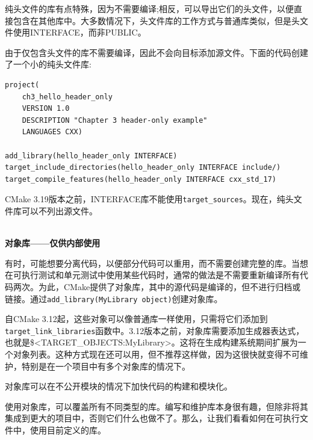 纯头文件的库有点特殊，因为不需要编译;相反，可以导出它们的头文件，以便直接包含在其他库中。大多数情况下，头文件库的工作方式与普通库类似，但是头文件使用INTERFACE，而非PUBLIC。

由于仅包含头文件的库不需要编译，因此不会向目标添加源文件。下面的代码创建了一个小的纯头文件库:

\begin{lstlisting}[style=styleCMake]
project(
	ch3_hello_header_only
	VERSION 1.0
	DESCRIPTION "Chapter 3 header-only example"
	LANGUAGES CXX)

add_library(hello_header_only INTERFACE)
target_include_directories(hello_header_only INTERFACE include/)
target_compile_features(hello_header_only INTERFACE cxx_std_17)
\end{lstlisting}

CMake 3.19版本之前，INTERFACE库不能使用\texttt{target\_sources}。现在，纯头文件库可以不列出源文件。

\hspace*{\fill} \\ %
\noindent
\textbf{对象库——仅供内部使用}

有时，可能想要分离代码，以便部分代码可以重用，而不需要创建完整的库。当想在可执行测试和单元测试中使用某些代码时，通常的做法是不需要重新编译所有代码两次。为此，CMake提供了对象库，其中的源代码是编译的，但不进行归档或链接。通过\texttt{add\_library(MyLibrary object)}创建对象库。

自CMake 3.12起，这些对象可以像普通库一样使用，只需将它们添加到\texttt{target\_link\_libraries}函数中。3.12版本之前，对象库需要添加生成器表达式，也就是\$<TARGET\_OBJECTS:MyLibrary>。这将在生成构建系统期间扩展为一个对象列表。这种方式现在还可以用，但不推荐这样做，因为这很快就变得不可维护，特别是在一个项目中有多个对象库的情况下。

\begin{tcolorbox}[colback=blue!5!white,colframe=blue!75!black,title=何时使用对象库]
对象库可以在不公开模块的情况下加快代码的构建和模块化。
\end{tcolorbox}

使用对象库，可以覆盖所有不同类型的库。编写和维护库本身很有趣，但除非将其集成到更大的项目中，否则它们什么也做不了。那么，让我们看看如何在可执行文件中，使用目前定义的库。








